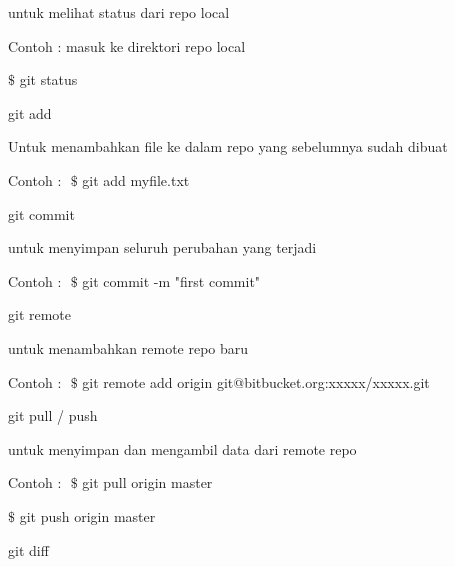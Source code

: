 \vspace{\baselineskip}
untuk melihat status dari repo local \par
\noindent 
\vspace{\baselineskip}
Contoh : masuk ke direktori repo local \par
\noindent 
\vspace{\baselineskip}
 $  \$  $ git status \par
\vspace{12pt}
\noindent 
git add $  $ \par
\noindent 
\vspace{\baselineskip}
Untuk menambahkan file ke dalam repo yang sebelumnya sudah dibuat \par
\noindent 
\vspace{\baselineskip}
Contoh : $  $ $  \$  $ git add myfile.txt \par
\vspace{12pt}
\vspace{12pt}
\noindent 
git commit \par
\noindent 
\vspace{\baselineskip}
untuk menyimpan seluruh perubahan yang terjadi \par
\noindent 
\vspace{\baselineskip}
Contoh : $  $ $  \$  $ git commit -m "first commit" \par
\vspace{12pt}
\noindent 
git remote $  $ \par
\noindent 
\vspace{\baselineskip}
untuk menambahkan remote repo baru \par
\noindent 
\vspace{\baselineskip}
Contoh : $  $ $  \$  $ git remote add origin git@bitbucket.org:xxxxx/xxxxx.git \par
\vspace{12pt}
\noindent 
git pull / push \par
\noindent 
\vspace{\baselineskip}
untuk menyimpan dan mengambil data dari remote repo \par
\noindent 
\vspace{\baselineskip}
Contoh : $  $ $  \$  $ git pull origin master \par
\noindent 
\vspace{\baselineskip}
 $  \$  $ git push origin master \par
\vspace{12pt}
\noindent 
git diff $  $ \par

